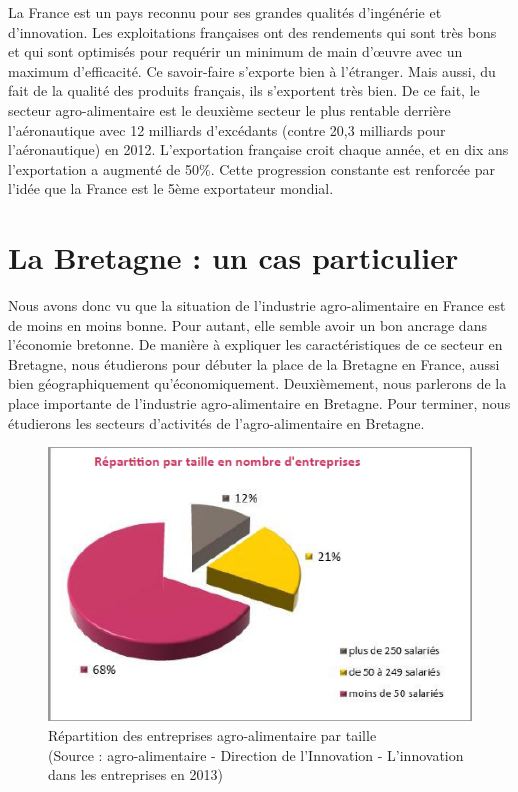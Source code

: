 \documentclass[a4paper,12pt]{report}
\begin{document}
			La France est un pays reconnu pour ses grandes qualités d’ingénérie et d’innovation. Les exploitations françaises ont des rendements qui sont très bons et qui sont optimisés pour requérir un minimum de main d'œuvre avec un maximum d’efficacité. Ce savoir-faire s’exporte bien à l’étranger. Mais aussi, du fait de la qualité des produits français, ils s’exportent très bien. De ce fait, le secteur agro-alimentaire est le deuxième secteur le plus rentable derrière l’aéronautique avec 12 milliards d’excédants (contre 20,3 milliards pour l’aéronautique) en 2012\cite{AAExport2014}. L’exportation française croit chaque année, et en dix ans l’exportation a augmenté de 50\%. Cette progression constante est renforcée par l’idée que la France est le 5ème exportateur mondial.

	\section{La Bretagne : un cas particulier}
	Nous avons donc vu que la situation de l’industrie agro-alimentaire en France est de moins en moins bonne. Pour autant, elle semble avoir un bon ancrage dans l’économie bretonne. De manière à expliquer les caractéristiques de ce secteur en Bretagne, nous étudierons pour débuter la place de la Bretagne en France, aussi bien géographiquement qu’économiquement. Deuxièmement, nous parlerons de la place importante de l’industrie agro-alimentaire en Bretagne. Pour terminer, nous étudierons les secteurs d’activités de l’agro-alimentaire en Bretagne.
	
	
	\begin{figure}[!h]
	\centering
	\includegraphics[scale=1]{Illustrations/RepartitionTaille.png}
	\caption{Répartition des entreprises agro-alimentaire par taille\\(Source : agro-alimentaire - Direction de l’Innovation - L’innovation dans les entreprises en 2013\cite{InnovationEntreprises2013})}
	\label{RepartitionParTaille}
	\end{figure}
	
\end{document}
